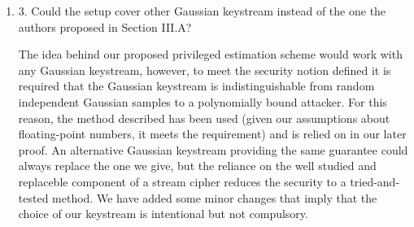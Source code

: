 \documentclass[a4paper]{scrartcl}
\newenvironment{rebuttal}{\begin{enumerate}[label={\color{grey}\thesection.\arabic{enumi}},leftmargin=0pt,ref=\thesection.\arabic{enumi}]}{\end{enumerate}}
\newcommand{\reviewtext}[1]{{\color{nblue} #1}}
\begin{document}
\begin{rebuttal}
\item \reviewtext{3. Could the setup cover other Gaussian keystream instead of the one the authors proposed in Section III.A?}

The idea behind our proposed privileged estimation scheme would work with any Gaussian keystream, however, to meet the security notion defined it is required that the Gaussian keystream is indistinguishable from random independent Gaussian samples to a polynomially bound attacker. For this reason, the method described has been used (given our assumptions about floating-point numbers, it meets the requirement) and is relied on in our later proof. An alternative Gaussian keystream providing the same guarantee could always replace the one we give, but the reliance on the well studied and replaceble component of a stream cipher reduces the security to a tried-and-tested method. We have added some minor changes that imply that the choice of our keystream is intentional but not compulsory.

\end{rebuttal}


\end{document}
